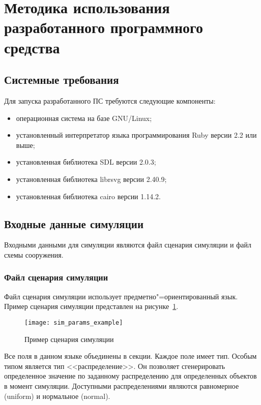 \section{Методика использования разработанного программного средства}
\label{sec:manual}

\subsection{Системные требования}
\label{sec:manual:requirements}

Для запуска разработанного ПС требуются следующие компоненты:
\begin{itemize}
  \item операционная система на базе GNU/Linux;
  \item установленный интерпретатор языка программирования Ruby версии 2.2 или выше;
  \item установленная библиотека SDL версии 2.0.3;
  \item установленная библиотека librsvg версии 2.40.9;
  \item установленная библиотека cairo версии 1.14.2.
\end{itemize}

\subsection{Входные данные симуляции}
\label{sec:manual:input}

Входными данными для симуляции являются файл сценария симуляции и файл схемы сооружения.

\subsubsection{Файл сценария симуляции}
\label{sec:manual:input:scenario}

Файл сценария симуляции использует предметно"=ориентированный язык.
Пример сценария симуляции представлен на рисунке~\ref{sec:manual:scenario_dsl_listing}.

\begin{figure}[ht!]
  \centering
  \texttt{[image: sim\_params\_example]}
  \caption{Пример сценария симуляции}
  \label{sec:manual:scenario_dsl_listing}
\end{figure}

Все поля в данном языке объединены в секции.
Каждое поле имеет тип. Особым типом является тип <<распределение>>.
Он позволяет сгенерировать определенное значение по заданному распределению для определенных объектов в момент симуляции.
Доступными распределениями являются равномерное (uniform) и нормальное (normal).

